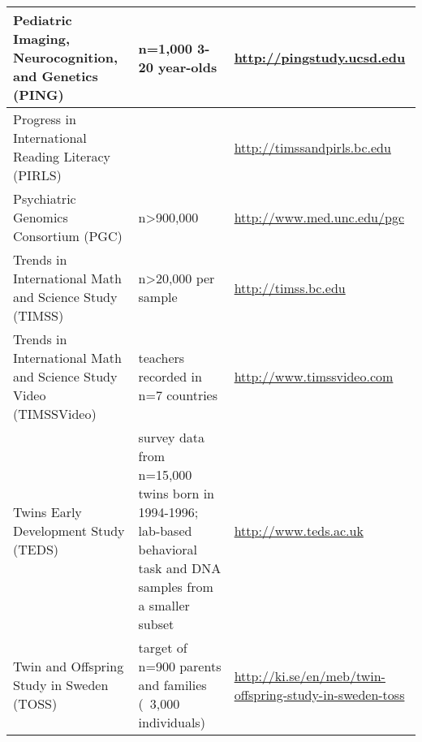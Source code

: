 \begin{table}[h!]
\begin{tabular}{| p{2.1in} | p{2.1in} | p{2.1in} | }
\hline
Pediatric Imaging, Neurocognition, and Genetics (PING) & n=1,000 3-20 year-olds & \url{http://pingstudy.ucsd.edu} \\
\hline
Progress in International Reading Literacy (PIRLS) & & \url{http://timssandpirls.bc.edu} \\
\hline
Psychiatric Genomics Consortium (PGC) & n>900,000 & \url{http://www.med.unc.edu/pgc} \\
\hline
Trends in International Math and Science Study (TIMSS) & n>20,000 per sample & \url{http://timss.bc.edu} \\
\hline
Trends in International Math and Science Study Video (TIMSSVideo) & teachers recorded in n=7 countries & \url{http://www.timssvideo.com} \\
\hline
Twins Early Development Study (TEDS) & survey data from n=15,000 twins born in 1994-1996; lab-based behavioral task and DNA samples from a smaller subset & \url{http://www.teds.ac.uk} \\
\hline
Twin and Offspring Study in Sweden (TOSS) & target of n=900 parents and families (~3,000 individuals) & \url{http://ki.se/en/meb/twin-offspring-study-in-sweden-toss} \\
\hline
\end{tabular}
\label{table:2}
\end{table}